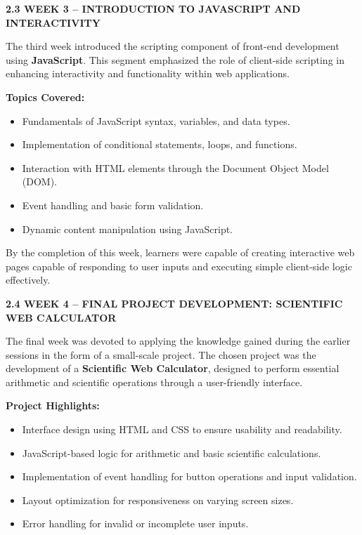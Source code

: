 \documentclass[a4paper,12pt,oneside]{report}
\numberwithin{equation}{chapter}
\numberwithin{figure}{chapter}
\numberwithin{table}{chapter}
\begin{document}
\vspace{5mm}
\noindent
\textbf{2.3 WEEK 3 – INTRODUCTION TO JAVASCRIPT AND INTERACTIVITY}

The third week introduced the scripting component of front-end development using \textbf{JavaScript}. This segment emphasized the role of client-side scripting in enhancing interactivity and functionality within web applications.

\textbf{Topics Covered:}
\begin{itemize}
    \item Fundamentals of JavaScript syntax, variables, and data types.
    \item Implementation of conditional statements, loops, and functions.
    \item Interaction with HTML elements through the Document Object Model (DOM).
    \item Event handling and basic form validation.
    \item Dynamic content manipulation using JavaScript.
\end{itemize}

By the completion of this week, learners were capable of creating interactive web pages capable of responding to user inputs and executing simple client-side logic effectively.

\newpage
\noindent
\textbf{2.4 WEEK 4 – FINAL PROJECT DEVELOPMENT: SCIENTIFIC WEB CALCULATOR}

The final week was devoted to applying the knowledge gained during the earlier sessions in the form of a small-scale project. The chosen project was the development of a \textbf{Scientific Web Calculator}, designed to perform essential arithmetic and scientific operations through a user-friendly interface.

\textbf{Project Highlights:}
\begin{itemize}
    \item Interface design using HTML and CSS to ensure usability and readability.
    \item JavaScript-based logic for arithmetic and basic scientific calculations.
    \item Implementation of event handling for button operations and input validation.
    \item Layout optimization for responsiveness on varying screen sizes.
    \item Error handling for invalid or incomplete user inputs.
\end{itemize}
\end{document}
